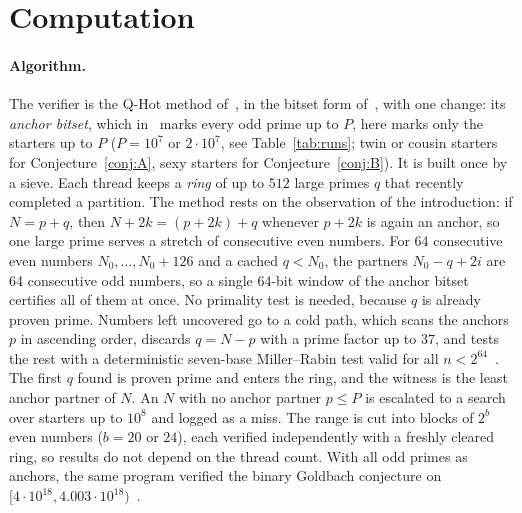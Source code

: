 \documentclass[11pt]{article}
\theoremstyle{definition}
\theoremstyle{remark}
\begin{document}
\section{Computation}\label{sec:computation}

\paragraph{Algorithm.}
The verifier is the Q-Hot method of~\cite{QHot,QHot2}, in the bitset form
of~\cite{QHot2}, with one change: its
\emph{anchor bitset}, which in~\cite{QHot2} marks every odd prime up to $P$, here
marks only the starters up to $P$ ($P=10^7$ or $2\cdot10^7$, see Table~\ref{tab:runs}; twin or cousin starters for
Conjecture~\ref{conj:A}, sexy starters for Conjecture~\ref{conj:B}). It is built
once by a sieve. Each thread keeps a \emph{ring} of up to $512$ large primes $q$
that recently completed a partition. The method rests on the observation of the
introduction: if $N=p+q$, then $N+2k=(p+2k)+q$ whenever $p+2k$ is again an
anchor, so one large prime serves a stretch of consecutive even numbers. For 64
consecutive even numbers $N_0,\dots,N_0+126$ and a cached $q<N_0$, the partners
$N_0-q+2i$ are 64 consecutive odd numbers, so a single 64-bit window of the
anchor bitset certifies all of them at once. No primality test is needed,
because $q$ is already proven prime. Numbers left uncovered go to a cold path,
which scans the anchors $p$ in ascending order, discards $q=N-p$ with a prime
factor up to $37$, and tests the rest with a deterministic seven-base
Miller--Rabin test valid for all $n<2^{64}$~\cite{Sinclair,FG}. The first $q$
found is proven prime and enters the ring, and the witness is the least anchor
partner of $N$. An $N$ with no anchor partner $p\le P$ is escalated to a search
over starters up to $10^8$ and logged as a miss. The range is cut into blocks of
$2^{b}$ even numbers ($b=20$ or $24$), each verified independently with a
freshly cleared ring, so results do not depend on the thread count. With all
odd primes as anchors, the same program verified the binary Goldbach conjecture
on $[4\cdot10^{18},4.003\cdot10^{18})$~\cite{QHot2}.
\end{document}
